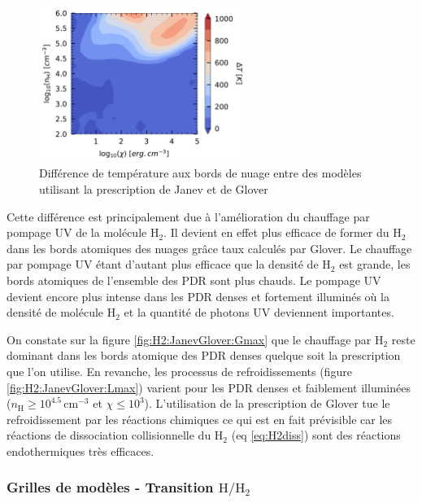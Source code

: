 \begin{figure}[!h]
    \centering \includegraphics[trim = {0 0 0 0 },clip,width=0.6\textwidth]{figure/H2/diffgrid_gloverjanev/mapTba_H2_n_1p7_nobossion_noCl155_n.pdf}
    \caption{Différence de température aux bords de nuage entre des modèles utilisant la prescription de Janev et de Glover}
    \label{fig:H2:JanevGlover:diffTba}
\end{figure}

Cette différence est principalement due à l'amélioration du chauffage par pompage UV de la molécule $\mathrm{H}_2$. Il devient en effet plus efficace de former du $\mathrm{H}_2$ dans les bords atomiques des nuages grâce taux calculés par Glover. Le chauffage par pompage UV étant d'autant plus efficace que la densité de $\mathrm{H}_2$ est grande, les bords atomiques de l'ensemble des PDR sont plus chauds. Le pompage UV devient encore plus intense dans les PDR denses et fortement illuminés où la densité de molécule $\mathrm{H}_2$ et la quantité de photons UV deviennent importantes. \newline

On constate sur la figure \ref{fig:H2:JanevGlover:Gmax} que le chauffage par $\mathrm{H}_2$ reste dominant dans les bords atomique des PDR denses quelque soit la prescription que l'on utilise. En revanche, les processus de refroidissements (figure \ref{fig:H2:JanevGlover:Lmax}) varient pour les PDR denses et faiblement illuminées ($n_\mathrm{H} \geq 10^{4.5} \, \mathrm{cm}^{-3}$ et $\chi \leq 10^3$). L'utilisation de la prescription de Glover tue le refroidissement par les réactions chimiques ce qui est en fait prévisible car les réactions de dissociation collisionnelle du $\mathrm{H}_2$ (eq \ref{eq:H2diss}) sont des réactions endothermiques très efficaces.




\subsubsection{Grilles de modèles - Transition $\mathrm{H}/\mathrm{H}_2$}

